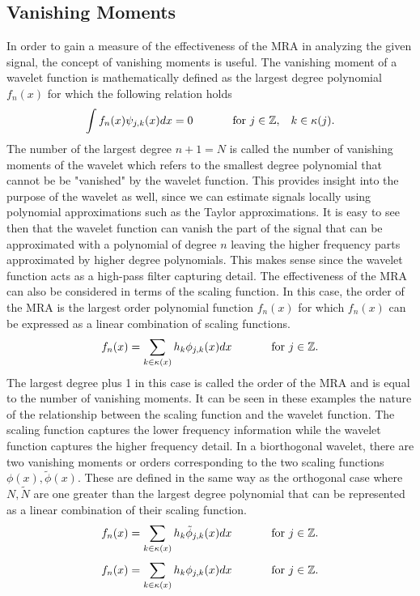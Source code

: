\documentclass{article}
\begin{document}
\subsection{Vanishing Moments}
In order to gain a measure of the effectiveness of the MRA in analyzing the given signal, the concept of vanishing moments is useful. The vanishing moment of a wavelet function is mathematically defined as the largest degree polynomial \(f_{n}(x)\) for which the following relation holds
\[\int f_{n}(x)\psi_{j,k}(x)dx=0 \text{  \hspace{1cm} for }j\in\mathbb{Z},\hspace{.3cm}k\in\kappa(j).\]
The number of the largest degree \(n+1=N\) is called the number of vanishing moments of the wavelet which refers to the smallest degree polynomial that cannot be be "vanished" by the wavelet function. This provides insight into the purpose of the wavelet as well, since we can estimate signals locally using polynomial approximations such as the Taylor approximations. It is easy to see then that the wavelet function can vanish the part of the signal that can be approximated with a polynomial of degree \(n\) leaving the higher frequency parts approximated by higher degree polynomials. This makes sense since the wavelet function acts as a high-pass filter capturing detail. The effectiveness of the MRA can also be considered in terms of the scaling function. In this case, the order of the MRA is the largest order polynomial function \(f_{n}(x)\) for which \(f_{n}(x)\) can be expressed as a linear combination of scaling functions.
\[f_{n}(x)=\sum_{k\in \kappa(x)}h_{k}\phi_{j,k}(x) dx\ \text{\hspace{1cm} for }j\in\mathbb{Z}.\]
The largest degree plus 1 in this case is called the order of the MRA and is equal to the number of vanishing moments. It can be seen in these examples the nature of the relationship between the scaling function and the wavelet function. The scaling function captures the lower frequency information while the wavelet function captures the higher frequency detail.
In a biorthogonal wavelet, there are two vanishing moments or orders corresponding to the two scaling functions \(\phi(x),\tilde{\phi}(x)\).
These are defined in the same way as the orthogonal case where \(N,\tilde{N}\) are one greater than the largest degree polynomial that can be represented as a linear combination of their scaling function.
\[f_{n}(x)=\sum_{k\in \kappa(x)}h_{k}\tilde{\phi}_{j,k}(x) dx\ \text{\hspace{1cm} for }j\in\mathbb{Z}.\]
\[f_{n}(x)=\sum_{k\in \kappa(x)}h_{k}\phi_{j,k}(x) dx\ \text{\hspace{1cm} for }j\in\mathbb{Z}.\]
\end{document}
